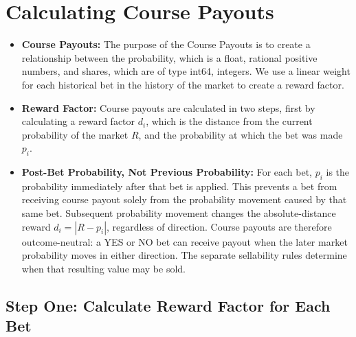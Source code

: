 \documentclass{article}
\begin{document}
\begin{center}
\end{center}


\begin{center}
\end{center}


\section*{Calculating Course Payouts}

\begin{itemize}
    \item \textbf{Course Payouts:} The purpose of the Course Payouts is to create a relationship between the probability, which is a float, rational positive numbers, and shares, which are of type int64, integers. We use a linear weight for each historical bet in the history of the market to create a reward factor.
    \item \textbf{Reward Factor:} Course payouts are calculated in two steps, first by calculating a reward factor \(d_i\), which is the distance from the current probability of the market \(R\), and the probability at which the bet was made \(p_i\).
    \item \textbf{Post-Bet Probability, Not Previous Probability:} For each bet, \(p_i\) is the probability immediately after that bet is applied. This prevents a bet from receiving course payout solely from the probability movement caused by that same bet. Subsequent probability movement changes the absolute-distance reward \(d_i = |R - p_i|\), regardless of direction. Course payouts are therefore outcome-neutral: a YES or NO bet can receive payout when the later market probability moves in either direction. The separate sellability rules determine when that resulting value may be sold.
\end{itemize}

\subsection*{Step One: Calculate Reward Factor for Each Bet}
\end{document}
